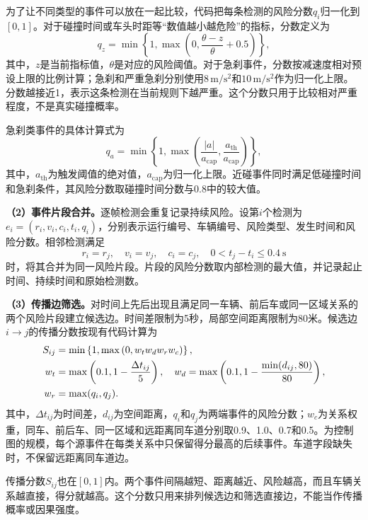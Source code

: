 \documentclass[UTF8,zihao=5,a4paper]{ctexart}
\begin{document}
为了让不同类型的事件可以放在一起比较，代码把每条检测的风险分数$q_i$归一化到$[0,1]$。对于碰撞时间或车头时距等“数值越小越危险”的指标，分数定义为
\begin{equation}
q_z=\min\left\{1,\max\left(0,\frac{\theta-z}{\theta}+0.5\right)\right\},
\label{eq:risk-inverse}
\end{equation}
其中，$z$是当前指标值，$\theta$是对应的风险阈值。对于急刹事件，分数按减速度相对预设上限的比例计算；急刹和严重急刹分别使用$8\,\mathrm{m/s^2}$和$10\,\mathrm{m/s^2}$作为归一化上限。分数越接近1，表示这条检测在当前规则下越严重。这个分数只用于比较相对严重程度，不是真实碰撞概率。

急刹类事件的具体计算式为
\begin{equation}
q_a=\min\left\{1,\max\left(\frac{|a|}{a_{\mathrm{cap}}},\frac{a_{\mathrm{th}}}{a_{\mathrm{cap}}}\right)\right\},
\label{eq:risk-braking}
\end{equation}
其中，$a_{\mathrm{th}}$为触发阈值的绝对值，$a_{\mathrm{cap}}$为归一化上限。近碰事件同时满足低碰撞时间和急刹条件，其风险分数取碰撞时间分数与0.8中的较大值。

\textbf{（2）事件片段合并。}逐帧检测会重复记录持续风险。设第$i$个检测为$e_i=(r_i,v_i,c_i,t_i,q_i)$，分别表示运行编号、车辆编号、风险类型、发生时间和风险分数。相邻检测满足
\begin{equation}
r_i=r_j,\quad v_i=v_j,\quad c_i=c_j,\quad 0<t_j-t_i\leq 0.4\ \mathrm{s}
\label{eq:merge}
\end{equation}
时，将其合并为同一风险片段。片段的风险分数取内部检测的最大值，并记录起止时间、持续时间和原始检测数。

\textbf{（3）传播边筛选。}对时间上先后出现且满足同一车辆、前后车或同一区域关系的两个风险片段建立候选边。时间差限制为5秒，局部空间距离限制为80米。候选边$i\rightarrow j$的传播分数按现有代码计算为
\begin{align}
S_{ij}&=\min\left\{1,\max\left(0,w_t w_d w_r w_c\right)\right\}, \label{eq:score}\\
w_t&=\max\left(0.1,1-\frac{\Delta t_{ij}}{5}\right),\quad
w_d=\max\left(0.1,1-\frac{\min(d_{ij},80)}{80}\right), \notag\\
w_r&=\max(q_i,q_j). \notag
\end{align}
其中，$\Delta t_{ij}$为时间差，$d_{ij}$为空间距离，$q_i$和$q_j$为两端事件的风险分数；$w_c$为关系权重，同车、前后车、同一区域和远距离同车道分别取0.9、1.0、0.7和0.5。为控制图的规模，每个源事件在每类关系中只保留得分最高的后续事件。车道字段缺失时，不保留远距离同车道边。

传播分数$S_{ij}$也在$[0,1]$内。两个事件间隔越短、距离越近、风险越高，而且车辆关系越直接，得分就越高。这个分数只用来排列候选边和筛选直接边，不能当作传播概率或因果强度。
\end{document}

